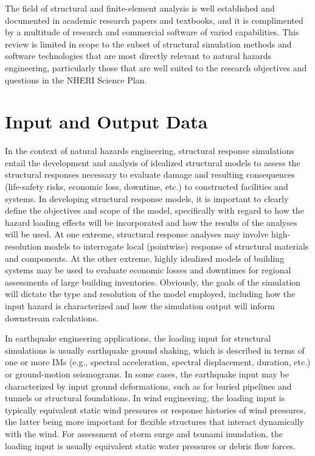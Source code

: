 The field of structural and finite-element analysis is well established and documented in academic research papers and textbooks, and it is complimented by a multitude of research and commercial software of varied capabilities. This review is limited in scope to the subset of structural simulation methods and software technologies that are most directly relevant to natural hazards engineering, particularly those that are well suited to the research objectives and questions in the NHERI Science Plan. 

\section{Input and Output Data}
\label{sec:resp_struct_io}

In the context of natural hazards engineering, structural response simulations entail the development and analysis of idealized structural models to assess the structural responses necessary to evaluate damage and resulting consequences (life-safety risks, economic loss, downtime, etc.) to constructed facilities and systems. In developing structural response models, it is important to clearly define the objectives and scope of the model, specifically with regard to how the hazard loading effects will be incorporated and how the results of the analyses will be used. At one extreme, structural response analyses may involve high-resolution models to interrogate local (pointwise) response of structural materials and components. At the other extreme, highly idealized models of building systems may be used to evaluate economic losses and downtimes for regional assessments of large building inventories. Obviously, the goals of the simulation will dictate the type and resolution of the model employed, including how the input hazard is characterized and how the simulation output will inform downstream calculations.

In earthquake engineering applications, the loading input for structural simulations is usually earthquake ground shaking, which is described in terms of one or more IMs (e.g., spectral acceleration, spectral displacement, duration, etc.) or ground-motion seismograms. In some cases, the earthquake input may be characterized by input ground deformations, such as for buried pipelines and tunnels or structural foundations. In wind engineering, the loading input is typically equivalent static wind pressures or response histories of wind pressures, the latter being more important for flexible structures that interact dynamically with the wind. For assessment of storm surge and tsunami inundation, the loading input is usually equivalent static water pressures or debris flow forces. 

